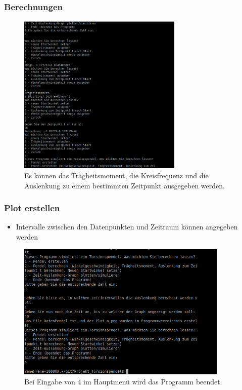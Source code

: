 \documentclass[11pt]{beamer}
\begin{document}
\begin{frame}
\frametitle{Berechnungen}
\begin{figure} [H]
\centering
\includegraphics[width=0.7\textwidth]{Teil_c.jpg}
\caption{Es können das Trägheitsmoment, die Kreisfrequenz und die Auslenkung zu einem bestimmten Zeitpunkt ausgegeben werden.}
\end{figure}
\end{frame}

\begin{frame}
\frametitle{Plot erstellen}
\begin{itemize}
\item Intervalle zwischen den Datenpunkten und Zeitraum können angegeben werden
\end{itemize}
\begin{figure} [H]
\centering
\includegraphics[width=0.9\textwidth]{Teil_z.jpg}
\caption{Bei Eingabe von 4 im Hauptmenü wird das Programm beendet.}
\end{figure}
\end{frame}
\end{document}
